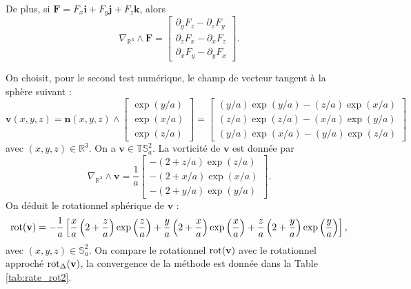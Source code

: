 De plus, si $\mathbf{F} = F_x \mathbf{i} + F_y \mathbf{j} + F_z  \mathbf{k}$, alors
\begin{equation}
\nabla_{\mathbb{R}^3} \wedge \mathbf{F} =
\begin{bmatrix}
\partial_y F_z - \partial_z F_y \\
\partial_z F_x - \partial_x F_z \\
\partial_x F_y - \partial_y F_x
\end{bmatrix} .
\end{equation}

On choisit, pour le second test numérique, le champ de vecteur tangent à la sphère suivant :
\begin{equation}
\mathbf{v}(x,y,z) = \mathbf{n}(x,y,z) \wedge \begin{bmatrix}
\exp (y/a) \\ \exp (x/a) \\ \exp (z/a)
\end{bmatrix} =
\begin{bmatrix}
(y/a) \exp (y/a) - (z/a) \exp (x/a)\\
(z/a) \exp (z/a) - (x/a) \exp (y/a)\\
(y/a) \exp (x/a) - (y/a) \exp (z/a)
\end{bmatrix} 
\label{eq:fun1_rot}
\end{equation}
avec $(x,y,z) \in \mathbb{R}^3$. On a $\mathbf{v} \in \mathbb{T}\mathbb{S}_a^2$.
La vorticité de $\mathbf{v}$ est donnée par
\begin{equation}
\nabla_{\mathbb{R}^3} \wedge \mathbf{v} = \dfrac{1}{a} \begin{bmatrix}
-(2+z/a) \exp (z/a)\\ -(2+x/a) \exp (x/a)\\ -(2+y/a) \exp (y/a)
\end{bmatrix}.
\end{equation}
On déduit le rotationnel sphérique de $\mathbf{v}$ :
\begin{equation}
\text{rot} ( \mathbf{v} ) = - \dfrac{1}{a} \left[ \dfrac{x}{a} \left( 2 + \dfrac{z}{a}  \right) \exp \left( \dfrac{z}{a} \right) + \dfrac{y}{a} \left( 2 + \dfrac{x}{a}  \right) \exp \left( \dfrac{x}{a} \right) + \dfrac{z}{a} \left( 2 + \dfrac{y}{a}  \right) \exp \left( \dfrac{y}{a} \right) \right],
\end{equation}
avec $(x,y,z) \in \mathbb{S}_a^2$. On compare le rotationnel $\text{rot} ( \mathbf{v} )$ avec le rotationnel approché $\text{rot}_{\Delta} ( \mathbf{v} )$, la convergence de la méthode est donnée dans la Table \ref{tab:rate_rot2}.

